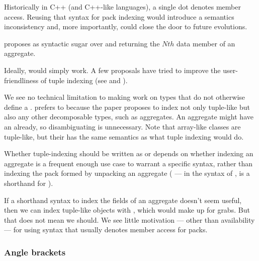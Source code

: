 \documentclass{wg21}
\begin{document}
Historically in C++ (and C++-like languages), a single dot denotes member access.
Reusing that syntax for pack indexing would introduce a semantics inconsistency and, more importantly, could close the door to future evolutions.

 proposes  as syntactic sugar over
and  returning the $Nth$ data member of an aggregate. %

Ideally,  would simply work.
A few proposals have tried to improve the user-friendliness
of tuple indexing (see
 and ).

We see no technical limitation to making  work on types that do not otherwise define a .
 prefers  to \tcode{[]} because the paper proposes to index not only tuple-like but also any other decomposable types, such as aggregates.
An aggregate might have an  already, so disambiguating is unnecessary.
Note that array-like classes are tuple-like, but their  has the same semantics as what tuple indexing would do. %

Whether tuple-indexing should be written as  or \tcode{[]} depends on whether indexing an aggregate is a frequent enough use case
to warrant a specific syntax, rather than indexing the pack formed by unpacking an aggregate ( --- in the syntax of ,  is a shorthand for ).

If %
a shorthand syntax to index the fields of an aggregate doesn't seem useful, then we can index tuple-like objects with , which would make
 up for grabs. But that does not mean we should. We see little motivation --- other than availability --- for using syntax that usually denotes member access for packs.

\subsubsection{Angle brackets}
\end{document}
